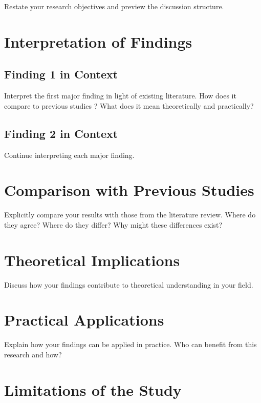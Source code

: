 \documentclass[12pt, a4paper]{report}
\begin{document}
	Restate your research objectives and preview the discussion structure.
	
	\section{Interpretation of Findings}
	\label{sec:interpretation}
	
	\subsection{Finding 1 in Context}
	
	Interpret the first major finding in light of existing literature. How does it compare to previous studies \citep{wilson2022}? What does it mean theoretically and practically?
	
	\subsection{Finding 2 in Context}
	
	Continue interpreting each major finding.
	
	\section{Comparison with Previous Studies}
	\label{sec:comparison}
	
	Explicitly compare your results with those from the literature review. Where do they agree? Where do they differ? Why might these differences exist?
	
	\section{Theoretical Implications}
	\label{sec:implications}
	
	Discuss how your findings contribute to theoretical understanding in your field.
	
	\section{Practical Applications}
	\label{sec:applications}
	
	Explain how your findings can be applied in practice. Who can benefit from this research and how?
	
	\section{Limitations of the Study}
	\label{sec:limitations}
	
\end{document}
